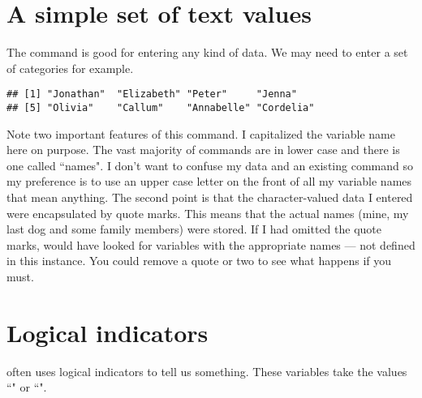  
\section{A simple set of text values} 
 
The  command is good for entering any kind of data. We may need to enter a set of categories for example. 
\begin{knitrout}
\color{fgcolor}\begin{kframe}
\begin{alltt}
 \hlkwb{=} \hlstd{(}\hlstd{,} \hlstd{,} \hlstd{,} \hlstd{,} \hlstd{,} \hlstd{,} \hlstd{,} \hlstd{)}
\end{alltt}
\begin{verbatim}
## [1] "Jonathan"  "Elizabeth" "Peter"     "Jenna"    
## [5] "Olivia"    "Callum"    "Annabelle" "Cordelia"
\end{verbatim}
\end{kframe}
\end{knitrout}
Note two important features of this command. I capitalized the variable name here on purpose. The vast majority of \R{} commands are in lower case and there is one called ``names". I don't want to confuse my data and an existing \R{} command so my preference is to use an upper case letter on the front of all my variable names that mean anything. The second point is that the character-valued data I entered were encapsulated by quote marks. This means that the actual names (mine, my last dog and some family members) were stored. If I had omitted the quote marks, \R{} would have looked for variables with the appropriate names --- not defined in this instance. You could remove a quote or two to see what happens if you must. 
 
\section{Logical indicators} 
 
\R{} often uses logical indicators to tell us something. These variables take the values ``" or ``". 
 
